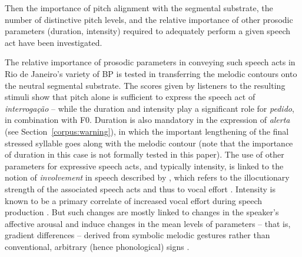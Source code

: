 \documentclass[output=paper]{LSP/langsci}
\begin{document}
Then the importance of pitch alignment with the segmental substrate, the number of distinctive pitch levels, and the relative importance of other prosodic parameters (duration, intensity) required to adequately perform a given speech act have been investigated.

The relative importance of prosodic parameters in conveying such speech acts in Rio de Janeiro’s variety of BP is tested in transferring the melodic contours onto the neutral segmental substrate. 
The scores given by listeners to the resulting stimuli show that pitch alone is sufficient to express the speech act of \textit{interrogação} -- while the duration and intensity play a significant role for \textit{pedido}, in combination with F0. 
Duration is also mandatory in the expression of \textit{alerta} (see Section~\ref{corpus:warning}), in which the important lengthening of the final stressed syllable goes along with the melodic contour (note that the importance of duration in this case is not formally tested in this paper). 
The use of other parameters for expressive speech acts, and typically intensity, is linked to the notion of \textit{involvement} in speech described by \citet{danes1994involvement}, which refers to the illocutionary strength of the associated speech acts and thus to vocal effort \citep{Gussenhoven2004}. 
Intensity is known to be a primary correlate of increased vocal effort during speech production \citep{Lienard1999,Traunmuller2000}. 
But such changes are mostly linked to changes in the speaker's affective arousal \citep{Goudbeek2010} and induce changes in the mean levels of parameters -- that is, gradient differences -- derived from symbolic melodic gestures rather than conventional, arbitrary (hence phonological) signs \citep[cf.][]{bolinger1986intonation}.
\end{document}
